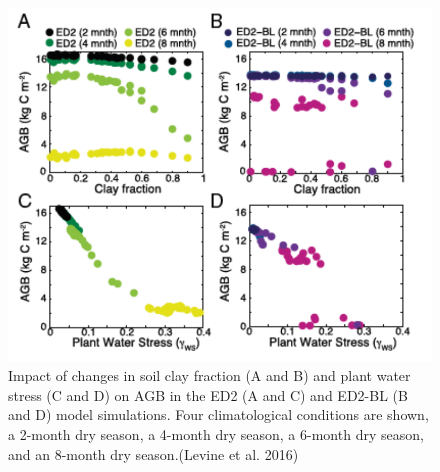 \documentclass[
  12pt,
  oneside]{book}
\begin{document}
\begin{figure}

{\centering \includegraphics[width=0.8\linewidth]{figures/chap6/f637_levine1} 

}

\caption{Impact of changes in soil clay fraction (A and B) and plant water stress (C and D) on AGB in the ED2 (A and C) and ED2-BL (B and D) model simulations. Four climatological conditions are shown, a 2-month dry season, a 4-month dry season, a 6-month dry season, and an 8-month dry season.(Levine et al. 2016)}\label{fig:f637}
\end{figure}
\end{document}
